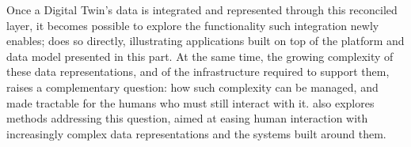 \begin{partsummary}
Once a Digital Twin's data is integrated and represented through this reconciled layer, it becomes possible to explore the functionality such integration newly enables;  does so directly, illustrating applications built on top of the platform and data model presented in this part. At the same time, the growing complexity of these data representations, and of the infrastructure required to support them, raises a complementary question: how such complexity can be managed, and made tractable for the humans who must still interact with it.  also explores methods addressing this question, aimed at easing human interaction with increasingly complex data representations and the systems built around them.

\end{partsummary}